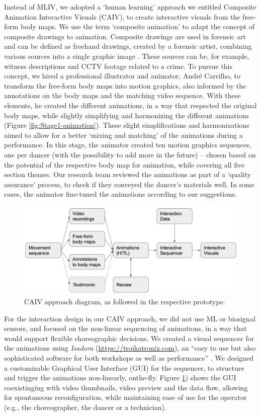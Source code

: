 Instead of MLIV, we adopted a ‘human learning’ approach we entitled Composite Animation Interactive Visuals (CAIV), to create interactive visuals from the free-form body maps. We use the term ‘composite animation’ to adapt the concept of composite drawings to animation. Composite drawings are used in forensic art and can be defined as freehand drawings, created by a forensic artist, combining various sources into a single graphic image \cite{stewart_forensic_2015}. These sources can be, for example, witness descriptions and CCTV footage related to a crime. To pursue this concept, we hired a professional illustrator and animator, André Carrilho, to transform the free-form body maps into motion graphics, also informed by the annotations on the body maps and the matching video sequence. With these elements, he created the different animations, in a way that respected the original body maps, while slightly simplifying and harmonizing the different animations (Figure \ref{fig:Stage1-animation}). These slight simplifications and harmonizations aimed to allow for a better ‘mixing and matching’ of the animations during a performance. In this stage, the animator created ten motion graphics sequences, one per dancer (with the possibility to add more in the future) – chosen based on the potential of the respective body map for animation, while covering all five section themes. Our research team reviewed the animations as part of a ‘quality assurance’ process, to check if they conveyed the dancer’s materials well. In some cases, the animator fine-tuned the animations according to our suggestions.

\begin{figure}[ht]
  \centering
  \includegraphics[width=0.7\linewidth]{Chapters/Figures/modi_dis/hitl-model.png}
  \caption{CAIV approach diagram, as followed in the respective prototype.}
    \label{fig:hitl-model}
\end{figure}

For the interaction design in our CAIV approach, we did not use ML or biosignal sensors, and focused on the non-linear sequencing of animations, in a way that would support flexible choreographic decisions. We created a visual sequencer for the animations using \textit{Isadora} (\url{https://troikatronix.com}), an “easy to use but also sophisticated software for both workshops as well as performance” \cite{delahunta_isadora_2005}. We designed a customizable Graphical User Interface (GUI) for the sequencer, to structure and trigger the animations non-linearly, onthe-fly. Figure \ref{fig:hitl-model}) shows the GUI coexistinging with video thumbnails, video preview and the data flow, allowing for spontaneous reconfiguration, while maintaining ease of use for the operator (e.g., the choreographer, the dancer or a technician).

